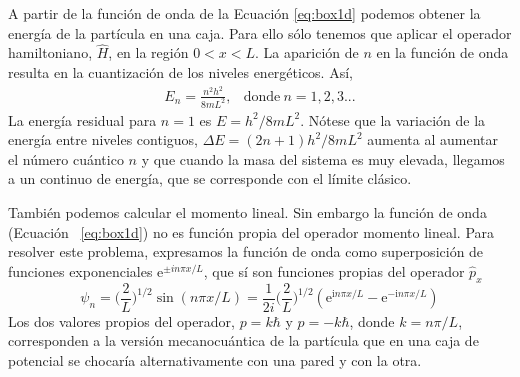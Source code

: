 \documentclass{tufte-handout}
\begin{document}
A partir de la función de onda de la Ecuación \ref{eq:box1d}
podemos obtener la energía de la partícula en una caja. Para
ello sólo tenemos que aplicar el operador hamiltoniano, 
$\hat{H}$, en la región $0< x<L$. La aparición de $n$ en
la función de onda resulta en la cuantización de los 
niveles energéticos. Así,
\begin{equation}
    \begin{array}{lr}
        E_n =\frac{n^2h^2}{8mL^2},& \mathrm{ donde~}n=1,2,3...
    \end{array}
\end{equation}
La energía residual para $n=1$ es $E=h^2/8mL^2$. 
Nótese que la variación de la energía entre niveles
contiguos, $\Delta E=(2n+1)h^2/8mL^2$ aumenta al aumentar el
número cuántico $n$ y que cuando la masa del sistema es muy
elevada, llegamos a un continuo de energía, que se
corresponde con el límite clásico.

También podemos calcular el momento lineal. Sin embargo la 
función de onda (Ecuación ~\ref{eq:box1d}) no es función
propia del operador momento lineal. Para resolver este
problema, expresamos la función de onda como superposición
de funciones exponenciales $\mathrm{e}^{\pm in\pi x/L}$, 
que sí son funciones propias del operador $\hat{p}_x$
\begin{equation}
    \psi_n=\bigg(\frac{2}{L}\bigg)^{1/2}\sin(n\pi x/L)=
    \frac{1}{2i}\bigg(\frac{2}{L}\bigg)^{1/2}(\mathrm{e}^{\mathrm{i}n\pi x/L} - \mathrm{e}^{-\mathrm{i}n\pi x/L})
\end{equation}
Los dos valores propios del operador, $p=k\hbar$ y 
$p=-k\hbar$, donde $k=n\pi/L$, corresponden a la versión mecanocuántica de 
la partícula que en una caja de potencial se chocaría
alternativamente con una pared y con la otra.
\end{document}
